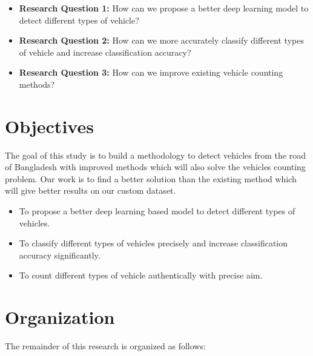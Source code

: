 \begin{itemize}
    \item \textbf{Research Question 1:}  How can we propose a better deep learning model to detect different types of vehicle?

    \item \textbf{Research Question 2: } How can we more accurately classify different types of vehicle and increase classification accuracy?

    \item \textbf{Research Question 3:} How can we improve existing vehicle counting methods?

\end{itemize}

\section{Objectives}
The goal of this study is to build a methodology to detect vehicles from the road of Bangladesh with improved methods which will also solve the vehicles counting problem. Our work is to find a better solution than the existing method which will give better results on our custom dataset.
\begin{itemize}
    \item To propose a better deep learning based model to detect different types of vehicles.

    \item To classify different types of vehicles precisely and increase classification accuracy significantly. 

    \item To count different types of vehicle authentically with precise aim.

\end{itemize}
\newpage
\section{Organization}

The remainder of this research is organized as follows:
   
